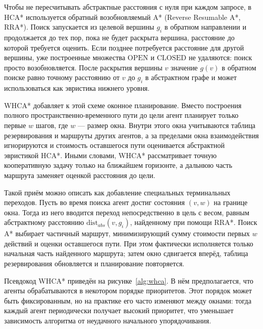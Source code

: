 Чтобы не пересчитывать абстрактные расстояния с нуля при каждом запросе, в HCA* используется обратный
возобновляемый A* (Reverse Resumable A*, RRA*). Поиск запускается из целевой вершины $g_i$ в обратном
направлении и продолжается до тех пор, пока не будет раскрыта вершина, расстояние до которой требуется
оценить. Если позднее потребуется расстояние для другой вершины, уже построенные множества
$\mathrm{OPEN}$ и $\mathrm{CLOSED}$ не удаляются: поиск просто возобновляется. После раскрытия вершины
$v$ значение $g(v)$ в обратном поиске равно точному расстоянию от $v$ до $g_i$ в абстрактном графе и
может использоваться как эвристика нижнего уровня.

WHCA* добавляет к этой схеме оконное планирование. Вместо построения полного пространственно-временного
пути до цели агент планирует только первые $w$ шагов, где $w$ --- размер окна. Внутри этого окна
учитываются таблица резервирования и маршруты других агентов, а за пределами окна взаимодействия
игнорируются и стоимость оставшегося пути оценивается абстрактной эвристикой HCA*. Иными словами,
WHCA* рассматривает точную кооперативную задачу только на ближайшем горизонте, а дальнюю часть маршрута
заменяет оценкой расстояния до цели.

Такой приём можно описать как добавление специальных терминальных переходов. Пусть во время поиска
агент достиг состояния $(v, w)$ на границе окна. Тогда из него вводится переход непосредственно в цель
с весом, равным абстрактному расстоянию $\mathrm{dist}_{abs}(v, g_i)$, найденному при помощи RRA*.
Поиск A* выбирает частичный маршрут, минимизирующий сумму стоимости первых $w$ действий и оценки
оставшегося пути. При этом фактически исполняется только начальная часть найденного маршрута; затем
окно сдвигается вперёд, таблица резервирования обновляется и планирование повторяется.

Псевдокод WHCA* приведён на рисунке~\ref{alg:whca}. В нём предполагается, что агенты обрабатываются
в некотором порядке приоритетов. Этот порядок может быть фиксированным, но на практике его часто
изменяют между окнами: тогда каждый агент периодически получает высокий приоритет, что уменьшает
зависимость алгоритма от неудачного начального упорядочивания.

